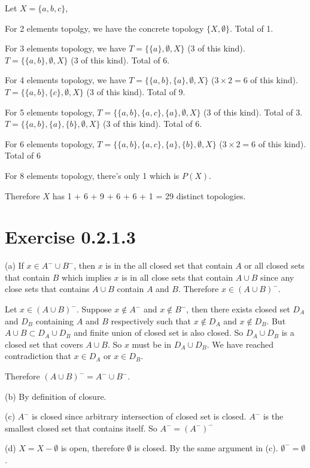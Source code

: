 \documentclass[12pt]{article}
\begin{document}
Let $X = \{a, b, c\}$, 

For 2 elements topolgy, we have the concrete topology $\{X, \emptyset\}$. Total of 1.

For 3 elements topology, we have $T=\{\{a\}, \emptyset, X\}$ (3 of this kind).  $T=\{\{a, b\}, \emptyset, X\}$ (3 of this kind). Total of 6. 

For 4 elements topology, we have $T=\{\{a, b\}, \{a\}, \emptyset, X\}$ ($3 \times 2 = 6$ of this kind). $T=\{\{a, b\}, \{c\}, \emptyset, X\}$ (3 of this kind). Total of 9.

For 5 elements topology, $T=\{\{a, b\}, \{a, c\}, \{a\}, \emptyset, X\}$ (3 of this kind). Total of 3. $T=\{\{a, b\}, \{a\}, \{b\}, \emptyset, X\}$ (3 of this kind). Total of 6.

For 6 elements topology,  $T=\{\{a, b\}, \{a, c\}, \{a\}, \{b\}, \emptyset, X\}$ ($3 \times 2=6$ of this kind). Total of 6

For 8 elements topology, there's only 1 which is $P(X)$. 

Therefore $X$ has 1 + 6 + 9 + 6 + 6 + 1 = 29 distinct topologies.\QED

\section*{Exercise 0.2.1.3}
(a) If $x \in A^- \cup B^-$, then $x$ is in the all closed set that contain $A$ or all closed sets that contain $B$ which implies $x$ is in all close sets that 
contain $A \cup B$ since any close sets that contains $A \cup B$ contain $A$ and $B$. Therefore $x \in (A \cup B)^-$.

Let $x \in (A \cup B)^-$.  Suppose $x \notin A^-$ and $x\notin B^-$, then there exists closed set $D_A$ and $D_B$ containing $A$ and $B$ respectively such that $x \notin D_A$ and $x \notin D_B$. But $A \cup B \subset D_A \cup D_B$ and finite union of closed set is also closed. So $D_A \cup D_B$ is a closed set that covers $A\cup B$. So $x$ must be in $D_A \cup D_B$. We have reached contradiction that $x \in D_A$ or $x \in D_B$. 

Therefore $(A \cup B)^- = A^- \cup B^-$. \QED

(b) By definition of closure. \QED

(c) $A^-$ is closed since arbitrary intersection of closed set is closed. 
 $A^-$ is the smallest closed set that contains itself. So $A^- = (A^-)^-$ \QED
 
(d) $X = X - \emptyset$ is open, therefore $\emptyset$ is closed. By the same argument in (c). $\emptyset^- = \emptyset$. \QED
\end{document}
